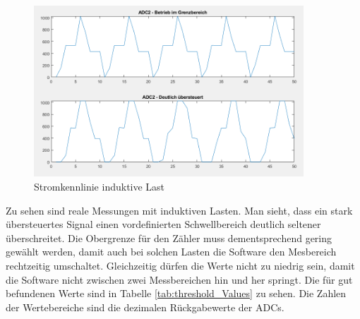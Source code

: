 \begin{figure}[H]
\begin{center}
\includegraphics[width=0.9\textwidth]{images/Software_stromkennlinie.png}
\caption{Stromkennlinie induktive Last}
\label{fig:Software_stromkennlinie_L}
\end{center}
\end{figure}

Zu sehen sind reale Messungen mit induktiven Lasten. Man sieht, dass ein stark übersteuertes Signal einen vordefinierten Schwellbereich deutlich seltener überschreitet. Die Obergrenze für den Zähler muss dementsprechend gering gewählt werden, damit auch bei solchen Lasten die Software den Mesbereich rechtzeitig umschaltet. Gleichzeitig dürfen die Werte nicht zu niedrig sein, damit die Software nicht zwischen zwei Messbereichen hin und her springt.
Die für gut befundenen Werte sind in Tabelle \ref{tab:threshold_Values} zu sehen. Die Zahlen der Wertebereiche sind die dezimalen Rückgabewerte der ADCs.

